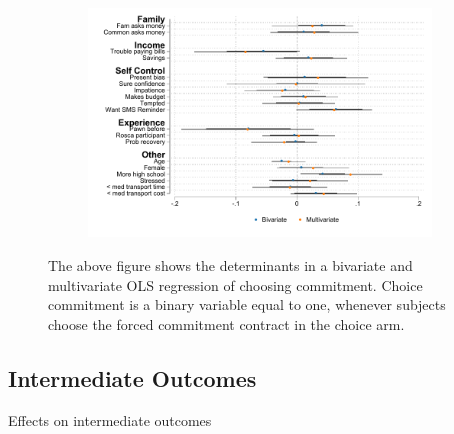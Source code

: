 \begin{appendix}
\begin{figure}[H]
    \caption{Determinants of choice.}
    \begin{center}
    \begin{subfigure}{0.65\textwidth}
        \centering
        \includegraphics[width=\textwidth]{Figuras/determinants_choose_commitment.pdf}
    \end{subfigure}
    \end{center}
\footnotesize{The above figure shows the determinants in a bivariate and multivariate OLS regression of choosing commitment. Choice commitment is a binary variable equal to one, whenever subjects choose the forced commitment contract in the choice arm. }
    \label{determinants_choose}
\end{figure}

\newpage
\subsection{Intermediate Outcomes}

\begin{landscape}
    
\begin{table}[!h]
\caption{Effects on intermediate outcomes}
\label{mechanisms}
\begin{center}

\scriptsize{}


\end{center}
\end{table}
\end{landscape}
\end{appendix}

